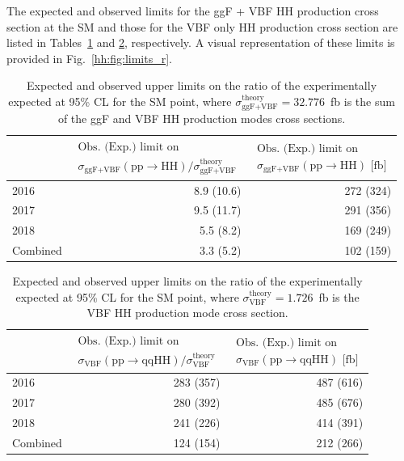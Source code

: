 \documentclass[../main.tex]{subfiles}
\begin{document}
The expected and observed limits for the ggF + VBF HH production cross section at the SM and those for the VBF only HH production cross section are listed in Tables~\ref{hh:tab:limit_r} and \ref{hh:tab:limit_rvbf}, respectively. A visual representation of these limits is provided in Fig.~\ref{hh:fig:limits_r}.

\begin{table}[h!]
\begin{center}
\begin{tabular}{l | r | r}
& 
$
\begin{matrix}
\text{Obs. (Exp.) limit on } \\ \sigma_{\text{ggF+VBF}}(\text{pp}\to\text{HH})/ \sigma_{\text{ggF+VBF}}^{\text{theory}} 
\end{matrix}
$
& 
$
\begin{matrix}
\text{Obs. (Exp.) limit on } \\ \sigma_{\text{ggF+VBF}}(\text{pp}\to\text{HH}) \text{~[fb]}
\end{matrix}
$ \\ \hline
2016 &     8.9 (10.6) & 272 (324) \\
2017 &     9.5 (11.7) & 291 (356) \\
2018 &     5.5 (8.2)  & 169 (249) \\
Combined & 3.3 (5.2)  & 102 (159)
\end{tabular}
\end{center}
\caption{Expected and observed upper limits on the ratio of the experimentally expected  at 95\% CL for the SM point, where $\sigma_{\text{ggF+VBF}}^{\text{theory}}=32.776$~fb is the sum of the ggF and VBF HH production modes cross sections.}
\label{hh:tab:limit_r}
\end{table}


\begin{table}[h!]
\begin{center}
\begin{tabular}{l | r | r}
& 
$
\begin{matrix}
\text{Obs. (Exp.) limit on } \\ \sigma_{\text{VBF}}(\text{pp}\to\text{qqHH})/ \sigma_{\text{VBF}}^{\text{theory}} 
\end{matrix}
$
& 
$
\begin{matrix}
\text{Obs. (Exp.) limit on } \\ \sigma_{\text{VBF}}(\text{pp}\to\text{qqHH}) \text{~[fb]}
\end{matrix}
$ \\ \hline
2016 &     283 (357) & 487 (616) \\
2017 &     280 (392) & 485 (676) \\
2018 &     241 (226) & 414 (391) \\
Combined & 124 (154) & 212 (266)
\end{tabular}
\end{center}
\caption{Expected and observed upper limits on the ratio of the experimentally expected  at 95\% CL for the SM point, where $\sigma_{\text{VBF}}^{\text{theory}}=1.726$~fb is the VBF HH production mode cross section.}
\label{hh:tab:limit_rvbf}
\end{table}
\end{document}
